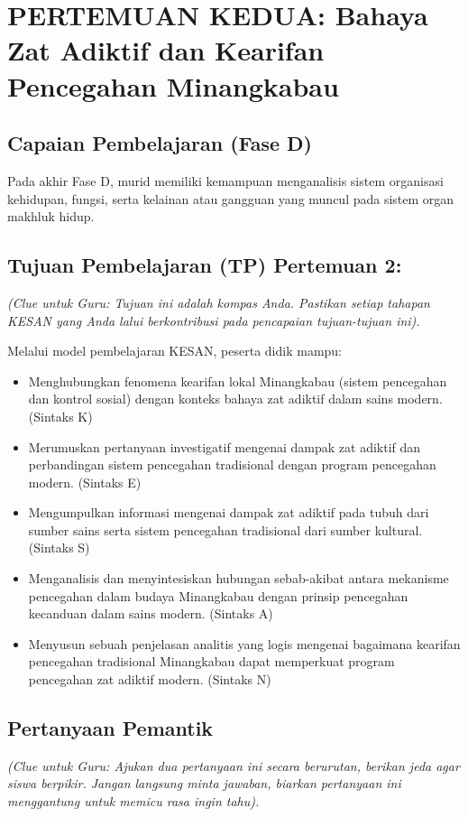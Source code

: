 \documentclass[a4paper,12pt]{article}
\begin{document}
\section{PERTEMUAN KEDUA: Bahaya Zat Adiktif dan Kearifan Pencegahan Minangkabau}

\subsection{Capaian Pembelajaran (Fase D)}
Pada akhir Fase D, murid memiliki kemampuan menganalisis sistem organisasi kehidupan, fungsi, serta kelainan atau gangguan yang muncul pada sistem organ makhluk hidup.

\subsection{Tujuan Pembelajaran (TP) Pertemuan 2:}
\textit{(Clue untuk Guru: Tujuan ini adalah kompas Anda. Pastikan setiap tahapan KESAN yang Anda lalui berkontribusi pada pencapaian tujuan-tujuan ini).}

Melalui model pembelajaran KESAN, peserta didik mampu:
\begin{itemize}
\item Menghubungkan fenomena kearifan lokal Minangkabau (sistem pencegahan dan kontrol sosial) dengan konteks bahaya zat adiktif dalam sains modern. (Sintaks K)
\item Merumuskan pertanyaan investigatif mengenai dampak zat adiktif dan perbandingan sistem pencegahan tradisional dengan program pencegahan modern. (Sintaks E)
\item Mengumpulkan informasi mengenai dampak zat adiktif pada tubuh dari sumber sains serta sistem pencegahan tradisional dari sumber kultural. (Sintaks S)
\item Menganalisis dan menyintesiskan hubungan sebab-akibat antara mekanisme pencegahan dalam budaya Minangkabau dengan prinsip pencegahan kecanduan dalam sains modern. (Sintaks A)
\item Menyusun sebuah penjelasan analitis yang logis mengenai bagaimana kearifan pencegahan tradisional Minangkabau dapat memperkuat program pencegahan zat adiktif modern. (Sintaks N)
\end{itemize}

\subsection{Pertanyaan Pemantik}
\textit{(Clue untuk Guru: Ajukan dua pertanyaan ini secara berurutan, berikan jeda agar siswa berpikir. Jangan langsung minta jawaban, biarkan pertanyaan ini menggantung untuk memicu rasa ingin tahu).}
\end{document}
